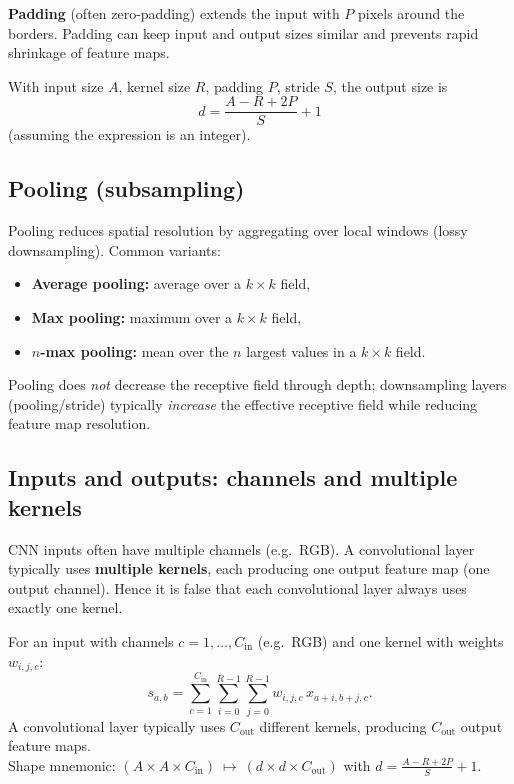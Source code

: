 \documentclass[11pt, oneside]{book}
\newcommand{\1}{\ind}                       %
\begin{document}
\textbf{Padding} (often zero-padding) extends the input with $P$ pixels around the borders. Padding can keep input and output sizes similar and prevents rapid shrinkage of feature maps.

\begin{thmbox}[title={CNN Output Size Formula}]
With input size $A$, kernel size $R$, padding $P$, stride $S$, the output size is
\[
d=\frac{A-R+2P}{S}+1
\]
(assuming the expression is an integer).
\end{thmbox}

\subsection{Pooling (subsampling)}
Pooling reduces spatial resolution by aggregating over local windows (lossy downsampling). Common variants:
\begin{itemize}
  \item \textbf{Average pooling:} average over a $k\times k$ field,
  \item \textbf{Max pooling:} maximum over a $k\times k$ field,
  \item \textbf{$n$-max pooling:} mean over the $n$ largest values in a $k\times k$ field.
\end{itemize}

\begin{notebox}[title={Exam Trap: Pooling and Receptive Field}]
Pooling does \emph{not} decrease the receptive field through depth; downsampling layers (pooling/stride) typically \emph{increase} the effective receptive field while reducing feature map resolution.
\end{notebox}

\subsection{Inputs and outputs: channels and multiple kernels}
CNN inputs often have multiple channels (e.g.\ RGB). A convolutional layer typically uses \textbf{multiple kernels}, each producing one output feature map (one output channel). Hence it is false that each convolutional layer always uses exactly one kernel.

\begin{thmbox}[title={Multi-Channel Convolution}]
For an input with channels $c=1,\dots,C_{\mathrm{in}}$ (e.g.\ RGB) and one kernel with weights $w_{i,j,c}$:
\[
s_{a,b}=\sum_{c=1}^{C_{\mathrm{in}}}\sum_{i=0}^{R-1}\sum_{j=0}^{R-1} w_{i,j,c}\,x_{a+i,b+j,c}.
\]
A convolutional layer typically uses $C_{\mathrm{out}}$ different kernels, producing $C_{\mathrm{out}}$ output feature maps.\\
Shape mnemonic: $(A\times A\times C_{\mathrm{in}})\ \mapsto\ (d\times d\times C_{\mathrm{out}})$ with $d=\frac{A-R+2P}{S}+1$.
\end{thmbox}
\end{document}
